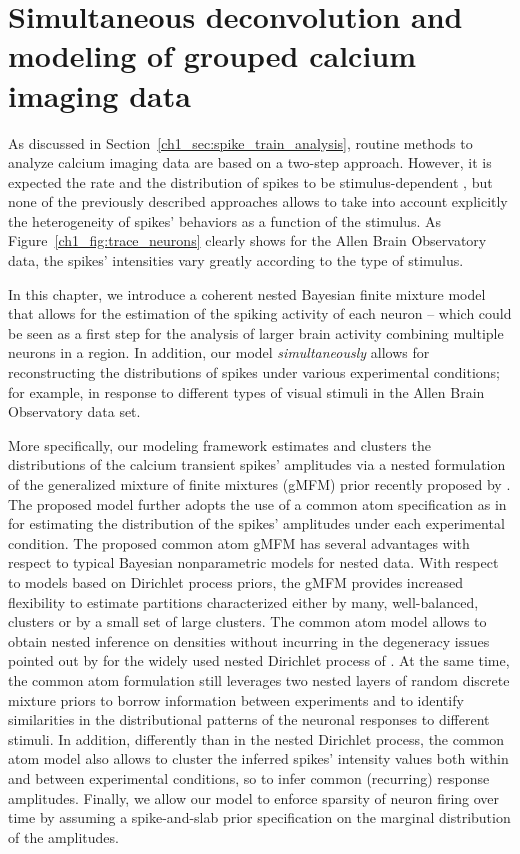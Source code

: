 \chapter{Simultaneous deconvolution and modeling of grouped calcium imaging data }

\vspace{.7cm}
As discussed in Section~\ref{ch1_sec:spike_train_analysis}, routine methods to analyze calcium imaging data are based on a two-step approach. 
However, it is expected the rate and the distribution of spikes to be stimulus-dependent \citep{Brenner2002PhysRevE}, but none of the previously described approaches allows to take into account explicitly the heterogeneity of spikes' behaviors as a function of the stimulus. 
As Figure~\ref{ch1_fig:trace_neurons} clearly shows for the Allen Brain Observatory data, the spikes' intensities vary greatly according to the type of stimulus.

In this chapter, we introduce a coherent nested Bayesian finite mixture model that allows for the estimation of the spiking activity of each neuron -- which could be seen as a first step for the analysis of larger brain activity combining multiple neurons in a region. In addition, our model \textit{simultaneously} allows for reconstructing the distributions of spikes under various experimental conditions; for example, in response to different types of visual stimuli in the Allen Brain Observatory data set. 

More specifically, our modeling framework estimates and clusters the distributions of the calcium transient spikes' amplitudes via a nested formulation of the generalized mixture of finite mixtures (gMFM) prior recently proposed by \citet{fruhwirthschnatter2020}. 
The proposed model further adopts the use of a common atom specification as in \citet{denti2021} for estimating the distribution of the spikes' amplitudes under each experimental condition. The proposed common atom gMFM has several advantages with respect to typical Bayesian nonparametric models for nested data. With respect to models based on Dirichlet process priors, the gMFM provides increased flexibility to estimate partitions characterized either by many, well-balanced, clusters or by a small set of large clusters. The common atom model allows to obtain nested inference on densities without incurring in the degeneracy issues pointed out by \citet{camerlenghi2019} for the widely used nested Dirichlet process of \citet{rodriguez2008}. At the same time, the common atom formulation still leverages two nested layers of random discrete mixture priors to borrow information between experiments and to identify similarities in the distributional patterns of the neuronal responses to different stimuli. In addition, differently than in the nested Dirichlet process, the common atom model also allows to cluster the inferred spikes' intensity values both within and between experimental conditions, so to infer common (recurring) response amplitudes. Finally, we allow our model to enforce sparsity of neuron firing over time by assuming a spike-and-slab prior specification on the marginal distribution of the amplitudes.


